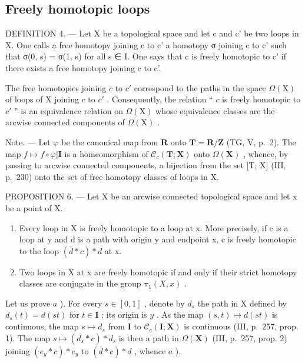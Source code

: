 \subsection{Freely homotopic loops}

DEFINITION 4. --- Let X be a topological space and let c and c' be two loops in X. One calls a free homotopy joining c to c' a homotopy σ joining c to c' such that σ(0, s) = σ(1, s) for all s ∈ I. One says that c is freely homotopic to c' if there exists a free homotopy joining c to c'.

The free homotopies joining \(c\) to \(c'\) correspond to the paths in the space \(\Omega(\mathrm{X})\) of loops of X joining \(c\) to \(c'\) . Consequently, the relation “ \(c\) is freely homotopic to \(c'\) ” is an equivalence relation on \(\Omega(\mathrm{X})\) whose equivalence classes are the arcwise connected components of \(\Omega(\mathrm{X})\) .

Note. --- Let \(\varphi\) be the canonical map from \(\mathbf{R}\) onto \(\mathbf{T} = \mathbf{R}/\mathbf{Z}\) (TG, V, p.~2). The map \(f \mapsto f \circ \varphi|\mathbf{I}\) is a homeomorphism of \(\mathcal{C}_c(\mathbf{T};\mathbf{X})\) onto \(\Omega(\mathbf{X})\) , whence, by passing to arcwise connected components, a bijection from the set {[}T; X{]} (III, p.~230) onto the set of free homotopy classes of loops in X.

PROPOSITION 6. --- Let X be an arcwise connected topological space and let x be a point of X.

\begin{enumerate}
\def\labelenumi{\alph{enumi})}
\item
  Every loop in X is freely homotopic to a loop at x. More precisely, if c is a loop at y and d is a path with origin y and endpoint x, c is freely homotopic to the loop \((\overline{d} * c) * d\) at x.
\item
  Two loops in X at x are freely homotopic if and only if their strict homotopy classes are conjugate in the group \(\pi_{1}(X,x)\) .
\end{enumerate}

Let us prove \(a\) ). For every \(s \in [0,1]\) , denote by \(d_s\) the path in X defined by \(d_s(t) = d(st)\) for \(t \in \mathbf{I}\) ; its origin is \(y\) . As the map \((s,t) \mapsto d(st)\) is continuous, the map \(s \mapsto d_s\) from \(\mathbf{I}\) to \(\mathcal{C}_c(\mathbf{I};\mathbf{X})\) is continuous (III, p.~257, prop. 1). The map \(s \mapsto (\overline{d_s} * c) * d_s\) is then a path in \(\Omega(\mathbf{X})\) (III, p.~257, prop. 2) joining \((e_y * c) * e_y\) to \((\overline{d} * c) * d\) , whence \(a\) ).

